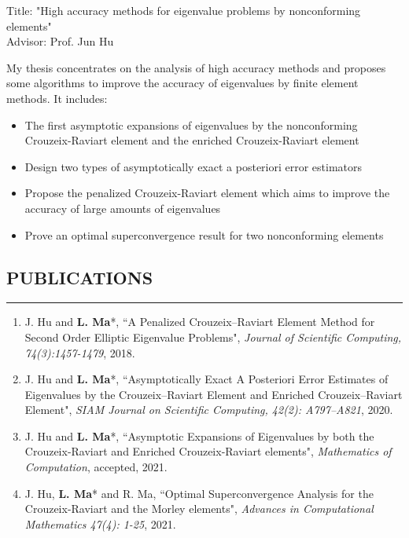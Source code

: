 \documentclass[10pt,a4]{article}
\begin{document}
\begin{small}
\begin{list}{}{}
\item Title: "High accuracy methods for eigenvalue problems by nonconforming elements"  \\
Advisor: Prof. Jun Hu
\item My thesis concentrates on the analysis of high accuracy methods and proposes some algorithms to improve the accuracy of eigenvalues by finite element methods.  It includes:
\begin{itemize}
\item The first asymptotic expansions of eigenvalues by the nonconforming Crouzeix-Raviart element and the enriched Crouzeix-Raviart element 
\item Design two types of asymptotically exact a posteriori error estimators
\item Propose the penalized Crouzeix-Raviart element which aims to improve the accuracy of large amounts of eigenvalues
\item Prove an optimal superconvergence result for two nonconforming elements
\end{itemize}
\end{list}

 
\subsection*{PUBLICATIONS}
\hrule
\vspace{0.2cm} 
\begin{enumerate}
	\item J. Hu and \textbf{L. Ma}*, ``A Penalized Crouzeix--Raviart Element Method for Second Order Elliptic Eigenvalue Problems",  {\it Journal of Scientific Computing, 74(3):1457-1479}, 2018.
	
	\item J. Hu and \textbf{L. Ma}*, ``Asymptotically Exact A Posteriori Error Estimates of Eigenvalues by the Crouzeix--Raviart Element and Enriched Crouzeix--Raviart Element",  {\it SIAM Journal on Scientific Computing, 42(2): A797--A821}, 2020.
	
	\item J. Hu and \textbf{L. Ma}*, ``Asymptotic Expansions of Eigenvalues by both the Crouzeix-Raviart and Enriched Crouzeix-Raviart elements", {\it Mathematics of Computation}, accepted, 2021.

	
	\item J. Hu, \textbf{L. Ma}* and R. Ma, ``Optimal Superconvergence Analysis for the Crouzeix-Raviart and the Morley elements",  {\it Advances in Computational Mathematics 47(4): 1-25}, 2021.


\end{enumerate}
\end{small}
\end{document}

